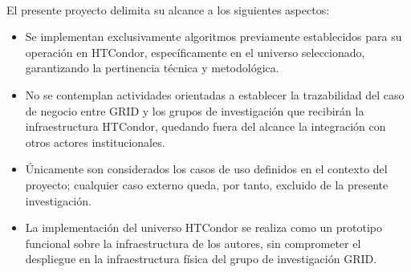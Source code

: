 \label{cap:alcance}
\mbox{}\\
\noindent
El presente proyecto delimita su alcance a los siguientes aspectos:

\begin{itemize}
	\item Se implementan exclusivamente algoritmos previamente establecidos para su operación en HTCondor, específicamente en el universo seleccionado, garantizando la pertinencia técnica y metodológica.
	\item No se contemplan actividades orientadas a establecer la trazabilidad del caso de negocio entre GRID y los grupos de investigación que recibirán la infraestructura HTCondor, quedando fuera del alcance la integración con otros actores institucionales.
	\item Únicamente son considerados los casos de uso definidos en el contexto del proyecto; cualquier caso externo queda, por tanto, excluido de la presente investigación.
	\item La implementación del universo HTCondor se realiza como un prototipo funcional sobre la infraestructura de los autores, sin comprometer el despliegue en la infraestructura física del grupo de investigación GRID.
\end{itemize}
